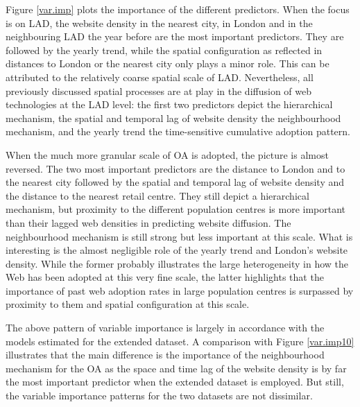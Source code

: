 \documentclass[
  authoryear,
  preprint,
  3p]{elsarticle}
\begin{document}
Figure \ref{var.imp} plots the importance of the different predictors.
When the focus is on LAD, the website density in the nearest city, in
London and in the neighbouring LAD the year before are the most
important predictors. They are followed by the yearly trend, while the
spatial configuration as reflected in distances to London or the nearest
city only plays a minor role. This can be attributed to the relatively
coarse spatial scale of LAD. Nevertheless, all previously discussed
spatial processes are at play in the diffusion of web technologies at
the LAD level: the first two predictors depict the hierarchical
mechanism, the spatial and temporal lag of website density the
neighbourhood mechanism, and the yearly trend the time-sensitive
cumulative adoption pattern.

When the much more granular scale of OA is adopted, the picture is
almost reversed. The two most important predictors are the distance to
London and to the nearest city followed by the spatial and temporal lag
of website density and the distance to the nearest retail centre. They
still depict a hierarchical mechanism, but proximity to the different
population centres is more important than their lagged web densities in
predicting website diffusion. The neighbourhood mechanism is still
strong but less important at this scale. What is interesting is the
almost negligible role of the yearly trend and London's website density.
While the former probably illustrates the large heterogeneity in how the
Web has been adopted at this very fine scale, the latter highlights that
the importance of past web adoption rates in large population centres is
surpassed by proximity to them and spatial configuration at this scale.

The above pattern of variable importance is largely in accordance with
the models estimated for the extended dataset. A comparison with Figure
\ref{var.imp10} illustrates that the main difference is the importance
of the neighbourhood mechanism for the OA as the space and time lag of
the website density is by far the most important predictor when the
extended dataset is employed. But still, the variable importance
patterns for the two datasets are not dissimilar.
\end{document}
